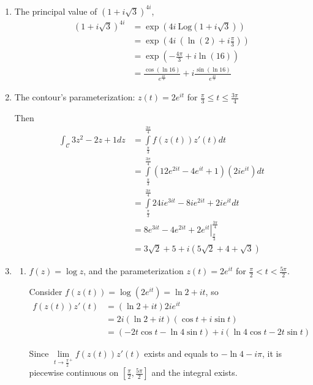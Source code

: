 \documentclass[12pt]{article}
\newcommand{\curve}{\mathcal{C}}
\newcommand{\integral}{\int\limits}
\begin{document}
\begin{enumerate}
    \item The principal value of $(1+i\sqrt3)^{4i}$,
        \begin{align*}
            (1+i\sqrt3)^{4i} &= \exp(4i ~\text{Log}(1+i\sqrt3)) \\
            &= \exp\left(4i ~ \left(\ln(2) + i\frac{\pi}{3}\right)\right) \\
            &= \exp\left(-\frac{4\pi}{3} + i\ln(16)\right)\\
            &= \frac{\cos(\ln16)}{e^{\frac{4\pi}{3}}} + i\frac{\sin(\ln16)}{e^{\frac{4\pi}{3}}}
        \end{align*}
    \pagebreak
    \item The contour's parameterization: $z(t) =  2e^{it}$ for $\frac{\pi}{3} \le t \le \frac{3\pi}{4}$

    Then
    \begin{align*}
        \int_\curve 3z^2 - 2z + 1 dz &= \integral^\frac{3\pi}{4}_\frac{\pi}{3} f(z(t))z'(t)dt\\
        &= \integral^\frac{3\pi}{4}_\frac{\pi}{3} (12e^{2it} - 4e^{it} + 1)(2ie^{it}) dt \\
        &= \integral^\frac{3\pi}{4}_\frac{\pi}{3} 24ie^{3it} - 8ie^{2it} + 2ie^{it} dt\\
        &\left. = 8e^{3it} -4e^{2it} +2e^{it} \right\vert_{\frac{\pi}{3}}^{\frac{3\pi}{4}}\\
        &= 3\sqrt2 + 5+ i (5\sqrt2 + 4 + \sqrt3)
    \end{align*}

    \item
    \begin{enumerate}
        \item $f(z) = \log z$, and the parameterization $z(t) = 2e^{it}$ for $\frac{\pi}{2} < t < \frac{5\pi}{2}$.

        Consider $f(z(t)) = \log(2e^{it}) = \ln2 + it$, so
        \begin{align*}
        f(z(t)) z'(t) &= (\ln2 +it)2ie^{it}\\
        &= 2i(\ln2 + it)(\cos t + i\sin t)\\
        &= (-2t\cos t - \ln4 \sin t )+ i(\ln4 \cos t - 2t\sin t)
        \end{align*}

        Since  $\lim\limits_{t \to \frac{\pi}{2}^{+}} f(z(t))z'(t)$ exists and equals to $-\ln4 - i\pi$,
        it is piecewise continuous on $[\frac{\pi}{2}, \frac{5\pi}{2}]$ and the integral exists.


\end{enumerate}
\end{enumerate}
\end{document}
